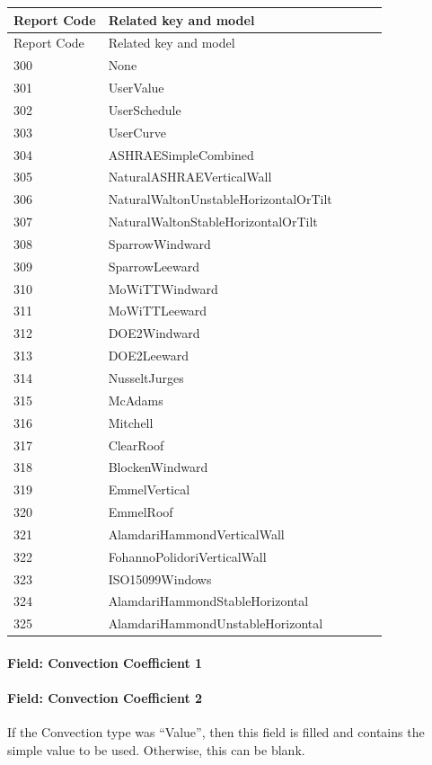 \begin{longtable}[c]{@{}ll@{}}
\toprule 
Report Code & Related key and model \tabularnewline
\midrule
\endfirsthead

\toprule 
Report Code & Related key and model \tabularnewline
\midrule
\endhead

300 & None~ \tabularnewline
301 & UserValue \tabularnewline
302 & UserSchedule \tabularnewline
303 & UserCurve~~~~~~~~~~~~~~~~~~~~~~~~~~~~~~ \tabularnewline
304 & ASHRAESimpleCombined~~~~~~~~~~~~~~~~~~~ \tabularnewline
305 & NaturalASHRAEVerticalWall~~~~~~~~~~~~~~ \tabularnewline
306 & NaturalWaltonUnstableHorizontalOrTilt~~ \tabularnewline
307 & NaturalWaltonStableHorizontalOrTilt~~~~ \tabularnewline
308 & SparrowWindward~~~~~~~~~~~~~~~~~~~~~~~~ \tabularnewline
309 & SparrowLeeward~~~~~~~~~~~~~~~~~~~~~~~~~ \tabularnewline
310 & MoWiTTWindward~~~~~~~~~~~~~~~~~~~~~~~~~ \tabularnewline
311 & MoWiTTLeeward~~~~~~~~~~~~~~~~~~~~~~~~~~ \tabularnewline
312 & DOE2Windward~~~~~~~~~~~~~~~~~~~~~~~~~~~ \tabularnewline
313 & DOE2Leeward~~~~~~~~~~~~~~~~~~~~~~~~~~~~ \tabularnewline
314 & NusseltJurges~~~~~~~~~~~~~~~~~~~~~~~~~~ \tabularnewline
315 & McAdams~~~~~~~~~~~~~~~~~~~~~~~~~~~~~~~~ \tabularnewline
316 & Mitchell~~~~~~~~~~~~~~~~~~~~~~~~~~~~~~~ \tabularnewline
317 & ClearRoof~~~~~~~~~~~~~~~~~~~~~~~~~~~~~~ \tabularnewline
318 & BlockenWindward~~~~~~~~~~~~~~~~~~~~~~~~ \tabularnewline
319 & EmmelVertical~~~~~~~~~~~~ ~~~~~~~~~~~~~~ \tabularnewline
320 & EmmelRoof~~~~~~~~~~~~~~~~~~~~~~~~~~~~~~ \tabularnewline
321 & AlamdariHammondVerticalWall~~~~~~~~~~~~ \tabularnewline
322 & FohannoPolidoriVerticalWall~~~~~~~~~~~~ \tabularnewline
323 & ISO15099Windows~~~~~~~~~~~~~~~~~~~~~~~~ \tabularnewline
324 & AlamdariHammondStableHorizontal~~~~~~~~ \tabularnewline
325 & AlamdariHammondUnstableHorizontal~~~~~~ \tabularnewline
\bottomrule
\end{longtable}

\paragraph{Field: Convection Coefficient 1}\label{field-convection-coefficient-1-1}

\paragraph{Field: Convection Coefficient 2}\label{field-convection-coefficient-2-1}

If the Convection type was ``Value'', then this field is filled and contains the simple value to be used. Otherwise, this can be blank.

